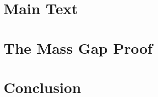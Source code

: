 \documentclass[11pt,a4paper]{report}
\begin{document}
\maketitle
\begin{abstract}

\end{abstract}
\tableofcontents
\newpage

\part{Main Text}




\part{The Mass Gap Proof}



\part{Conclusion}

\end{document}
